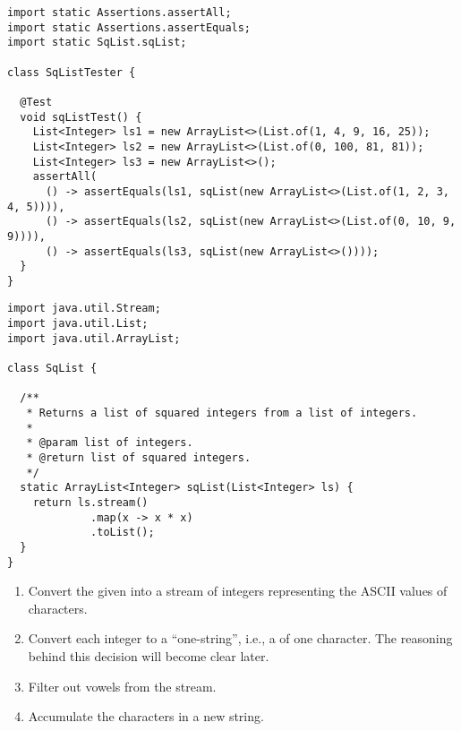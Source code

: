 
\begin{cl}[]{}
\begin{lstlisting}[language=MyJava]
import static Assertions.assertAll;
import static Assertions.assertEquals;
import static SqList.sqList;

class SqListTester {

  @Test
  void sqListTest() {
    List<Integer> ls1 = new ArrayList<>(List.of(1, 4, 9, 16, 25));
    List<Integer> ls2 = new ArrayList<>(List.of(0, 100, 81, 81));
    List<Integer> ls3 = new ArrayList<>();
    assertAll(
      () -> assertEquals(ls1, sqList(new ArrayList<>(List.of(1, 2, 3, 4, 5)))),
      () -> assertEquals(ls2, sqList(new ArrayList<>(List.of(0, 10, 9, 9)))),
      () -> assertEquals(ls3, sqList(new ArrayList<>())));
  }
}
\end{lstlisting}    
\end{cl}

\begin{cl}[]{}
\begin{lstlisting}[language=MyJava]
import java.util.Stream;
import java.util.List;
import java.util.ArrayList;

class SqList {

  /**
   * Returns a list of squared integers from a list of integers.
   *
   * @param list of integers.
   * @return list of squared integers.
   */
  static ArrayList<Integer> sqList(List<Integer> ls) {
    return ls.stream()
             .map(x -> x * x)
             .toList();
  }
}
\end{lstlisting}    
\end{cl}


\begin{enumerate}
    \item Convert the given  into a stream of integers representing the ASCII values of characters.
    \item Convert each integer to a ``one-string'', i.e., a  of one character. The reasoning behind this decision will become clear later.
    \item Filter out vowels from the stream.
    \item Accumulate the characters in a new string.
\end{enumerate}

